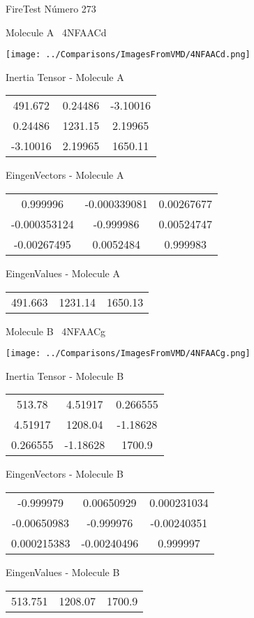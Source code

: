 \vtab[-3cm]
\begin{center}
{\large FireTest \tab Número 273}
\end{center}
\begin{multicols}{2}
\begin{center}

Molecule A \
4NFAACd

\texttt{[image: ../Comparisons/ImagesFromVMD/4NFAACd.png]}

Inertia Tensor - Molecule A \\
\begin{tabular}{|c c c|}
491.672	 & 	0.24486	 & 	-3.10016	 \\
0.24486	 & 	1231.15	 & 	2.19965	 \\
-3.10016	 & 	2.19965	 & 	1650.11
\end{tabular}

\vtab
 EingenVectors - Molecule A     \\
\begin{tabular}{|c c c|}
0.999996	 & 	-0.000339081	 & 	0.00267677	 \\
-0.000353124	 & 	-0.999986	 & 	0.00524747	 \\
-0.00267495	 & 	0.0052484	 & 	0.999983
\end{tabular}

\vtab
 EingenValues - Molecule A     \\
\begin{tabular}{|c c c|}
491.663	 & 	1231.14	 & 	1650.13	 \\
\end{tabular}
\columnbreak

Molecule B \
4NFAACg

\texttt{[image: ../Comparisons/ImagesFromVMD/4NFAACg.png]}

Inertia Tensor - Molecule B \\
\begin{tabular}{|c c c|}
513.78	 & 	4.51917	 & 	0.266555	 \\
4.51917	 & 	1208.04	 & 	-1.18628	 \\
0.266555	 & 	-1.18628	 & 	1700.9
\end{tabular}

\vtab
 EingenVectors - Molecule B     \\
\begin{tabular}{|c c c|}
-0.999979	 & 	0.00650929	 & 	0.000231034	 \\
-0.00650983	 & 	-0.999976	 & 	-0.00240351	 \\
0.000215383	 & 	-0.00240496	 & 	0.999997
\end{tabular}

\vtab
 EingenValues - Molecule B     \\
\begin{tabular}{|c c c|}
513.751	 & 	1208.07	 & 	1700.9	 \\
\end{tabular}

\end{center}
\end{multicols}

